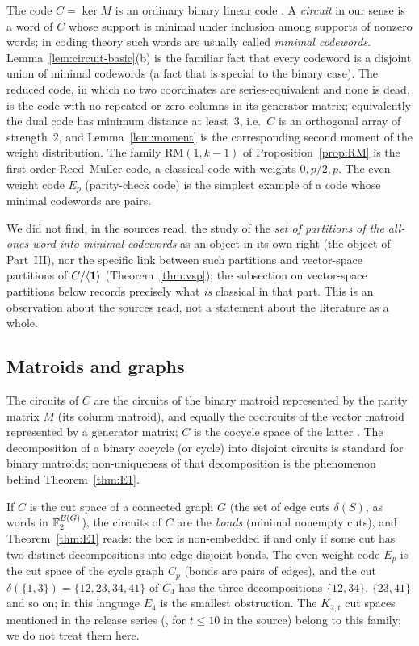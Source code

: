 The code $C=\ker M$ is an ordinary binary linear code \cite{MacWilliamsSloane1977,HuffmanPless2003}. A \emph{circuit} in our sense is a word of $C$ whose support is minimal under inclusion among supports of nonzero words; in coding theory such words are usually called \emph{minimal codewords}. Lemma~\ref{lem:circuit-basic}(b) is the familiar fact that every codeword is a disjoint union of minimal codewords (a fact that is special to the binary case). The reduced code, in which no two coordinates are series-equivalent and none is dead, is the code with no repeated or zero columns in its generator matrix; equivalently the dual code has minimum distance at least~$3$, i.e.\ $C$ is an orthogonal array of strength~$2$, and Lemma~\ref{lem:moment} is the corresponding second moment of the weight distribution. The family $\mathrm{RM}(1,k-1)$ of Proposition~\ref{prop:RM} is the first-order Reed--Muller code, a classical code with weights $0,p/2,p$. The even-weight code $E_p$ (parity-check code) is the simplest example of a code whose minimal codewords are pairs.

We did not find, in the sources read, the study of the \emph{set of partitions of the all-ones word into minimal codewords} as an object in its own right (the object of Part~III), nor the specific link between such partitions and vector-space partitions of $C/\langle\mathbf 1\rangle$ (Theorem~\ref{thm:vsp}); the subsection on vector-space partitions below records precisely what \emph{is} classical in that part. This is an observation about the sources read, not a statement about the literature as a whole.

\subsection{Matroids and graphs}

The circuits of $C$ are the circuits of the binary matroid represented by the parity matrix $M$ (its column matroid), and equally the cocircuits of the vector matroid represented by a generator matrix; $C$ is the cocycle space of the latter \cite{Oxley2011}. The decomposition of a binary cocycle (or cycle) into disjoint circuits is standard for binary matroids; non-uniqueness of that decomposition is the phenomenon behind Theorem~\ref{thm:E1}.

\begin{example}\label{ex:cut}
If $C$ is the cut space of a connected graph $G$ (the set of edge cuts $\delta(S)$, as words in $\mathbb F_2^{E(G)}$), the circuits of $C$ are the \emph{bonds} (minimal nonempty cuts), and Theorem~\ref{thm:E1} reads: the box is non-embedded if and only if some cut has two distinct decompositions into edge-disjoint bonds. The even-weight code $E_p$ is the cut space of the cycle graph $C_p$ (bonds are pairs of edges), and the cut $\delta(\{1,3\})=\{12,23,34,41\}$ of $C_4$ has the three decompositions $\{12,34\}$, $\{23,41\}$ and so on; in this language $E_4$ is the smallest obstruction. The $K_{2,t}$ cut spaces mentioned in the release series (, \CHECKED{} for $t\le10$ in the source) belong to this family; we do not treat them here.
\end{example}

